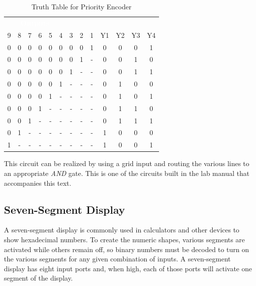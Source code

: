 \begin{table}[H]
  \sffamily
  \newcommand{\head}[1]{\textcolor{white}{\textbf{#1}}}    
  \begin{center}
    \begin{tabular}{ccccccccc|cccc} 
      \rowcolor{black!75}
      \multicolumn{9}{c}{\head{Inputs}} & \multicolumn{4}{c}{\head{Outputs}} \\
      9 & 8 & 7 & 6 & 5 & 4 & 3 & 2 & 1 & Y1 & Y2 & Y3 & Y4 \\
      \hline
      0 & 0 & 0 & 0 & 0 & 0 & 0 & 0 & 1 & 0 & 0 & 0 & 1 \\
      0 & 0 & 0 & 0 & 0 & 0 & 0 & 1 & - & 0 & 0 & 1 & 0 \\
      0 & 0 & 0 & 0 & 0 & 0 & 1 & - & - & 0 & 0 & 1 & 1 \\
      0 & 0 & 0 & 0 & 0 & 1 & - & - & - & 0 & 1 & 0 & 0 \\
      0 & 0 & 0 & 0 & 1 & - & - & - & - & 0 & 1 & 0 & 1 \\
      0 & 0 & 0 & 1 & - & - & - & - & - & 0 & 1 & 1 & 0 \\
      0 & 0 & 1 & - & - & - & - & - & - & 0 & 1 & 1 & 1 \\
      0 & 1 & - & - & - & - & - & - & - & 1 & 0 & 0 & 0 \\
      1 & - & - & - & - & - & - & - & - & 1 & 0 & 0 & 1
    \end{tabular}
  \end{center}
  \caption{Truth Table for Priority Encoder}
  \label{CL:tab:truth_table_for_priority_encoder}
\end{table}

This circuit can be realized by using a grid input and routing the various lines to an appropriate \emph{AND} gate. This is one of the circuits built in the lab manual that accompanies this text.

\subsection{Seven-Segment Display}
\label{CL:subsec:7_segment_display}

A seven-segment display is commonly used in calculators and other devices to show hexadecimal numbers. To create the numeric shapes, various segments are activated while others remain off, so binary numbers must be decoded to turn on the various segments for any given combination of inputs. A seven-segment display has eight input ports and, when high, each of those ports will activate one segment of the display. 

